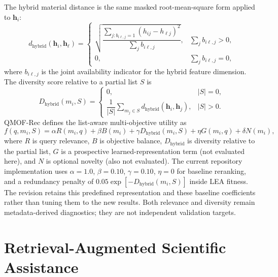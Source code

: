 \documentclass[12pt,a4paper]{article}
\begin{document}
The hybrid material distance is the same masked root-mean-square form applied to $\mathbf{h}_i$:
\begin{equation}
  d_{\mathrm{hybrid}}(\mathbf{h}_i,\mathbf{h}_\ell)=
  \begin{cases}
  \sqrt{\dfrac{\sum_{j:b_{i\ell,j}=1}(h_{ij}-h_{\ell j})^2}{\sum_j b_{i\ell,j}}}, & \sum_j b_{i\ell,j}>0,\\[8pt]
  0, & \sum_j b_{i\ell,j}=0,
  \end{cases}
\end{equation}
where $b_{i\ell,j}$ is the joint availability indicator for the hybrid feature dimension. The diversity score relative to a partial list $S$ is
\begin{equation}
  D_{\mathrm{hybrid}}(m_i,S)=
  \begin{cases}
  0, & |S|=0,\\[4pt]
  \dfrac{1}{|S|}\displaystyle\sum_{m_j\in S}d_{\mathrm{hybrid}}(\mathbf{h}_i,\mathbf{h}_j), & |S|>0.
  \end{cases}
\end{equation}
QMOF-Rec defines the list-aware multi-objective utility as
\begin{equation}
  f(q,m_i,S) = \alpha R(m_i,q) + \beta B(m_i) + \gamma D_{\mathrm{hybrid}}(m_i,S) + \eta G(m_i,q) + \delta N(m_i),
  \label{eq:utility}
\end{equation}
where $R$ is query relevance, $B$ is objective balance, $D_{\mathrm{hybrid}}$ is diversity relative to the partial list, $G$ is a prospective learned-representation term (not evaluated here), and $N$ is optional novelty (also not evaluated). The current repository implementation uses $\alpha=1.0$, $\beta=0.10$, $\gamma=0.10$, $\eta=0$ for baseline reranking, and a redundancy penalty of $0.05\exp[-D_{\mathrm{hybrid}}(m_i,S)]$ inside LEA fitness. The revision retains this predefined representation and these baseline coefficients rather than tuning them to the new results. Both relevance and diversity remain metadata-derived diagnostics; they are not independent validation targets.

\section{Retrieval-Augmented Scientific Assistance}
\label{sec:rag_form}
\end{document}
